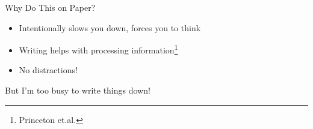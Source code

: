 \documentclass[aspectratio=169]{beamer}
\begin{document}
    {
    \begin{frame}{Why Do This on Paper?}
        \begin{itemize}
            \item Intentionally slows you down, forces you to think
            \item Writing helps with processing information\footnote{Princeton et.al.}
            \item No distractions!
        \end{itemize}
    \end{frame}
    }

    {
    \begin{frame}%
        \begin{titlebox}
            \centering
            But I'm too busy to write things down!
        \end{titlebox}
    \end{frame}
    }
\end{document}

